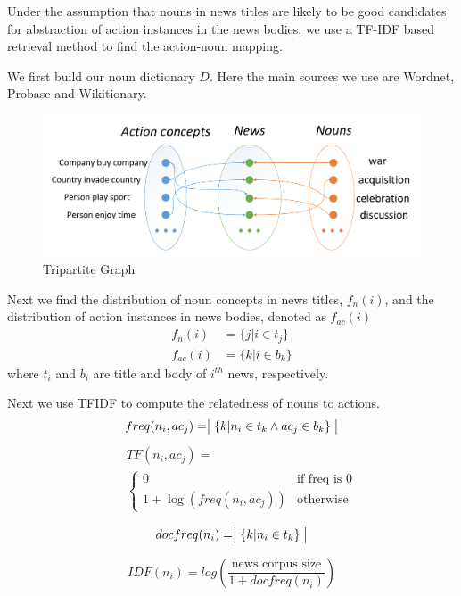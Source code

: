 Under the assumption that nouns in news titles are likely to be good candidates
for abstraction of action instances in the news bodies, we use a TF-IDF based retrieval method
to find the action-noun mapping.

We first build our noun dictionary $D$. Here the main sources we use are Wordnet, 
Probase and Wikitionary.
\begin{figure}[h]
\includegraphics[width=\columnwidth]{img/ac2}
\caption{Tripartite Graph}
\label{fig:tripartite}
\end{figure}


Next we find the distribution of noun concepts in news titles, $f_n(i)$, and the distribution of action instances in news bodies, denoted as $f_{ac}(i)$ 
\begin{align*}
    f_n(i) & = \{ j |  i \in t_j \} \\
    f_{ac}(i) &= \{ k | i \in b_k \}
\end{align*}
where $t_i$ and $b_i$ are title and body of $i^{th}$ news, respectively. 

Next we use TFIDF to compute the relatedness of nouns to actions. 
\begin{equation*}
    freq(n_i, ac_j) = \bigm| \{ k | n_i \in t_k \land ac_j \in b_k \} \bigm|
\end{equation*}
\begin{eqnarray*}
&& TF(n_i, ac_j) = \\
&&\begin{cases} 0 &\mbox{if freq is 0} \\
        1 + \log(freq(n_i, ac_j)) &\mbox{otherwise}
    \end{cases}
\end{eqnarray*}


\begin{equation*}
    docfreq(n_i) = \bigm|\{ k | n_i \in t_k \}\bigm|
\end{equation*}


\begin{equation*}
    IDF(n_i) = log(\frac{\text{news corpus size}}{1 + docfreq(n_i)})
\end{equation*}

